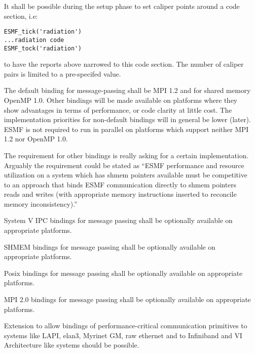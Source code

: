 
It shall be possible during the setup phase to set caliper points
around a code section, i.e:

\begin{verbatim}
ESMF_tick('radiation')
...radiation code
ESMF_tock('radiation')
\end{verbatim}

to have the reports above narrowed to this code section. The number of
caliper pairs is limited to a pre-specifed value.



The default binding for message-passing shall be MPI 1.2 and for
shared memory OpenMP 1.0. Other bindings will be made available on
platforms where they show advantages in terms of performance, or code
clarity at little cost. The implementation priorities for non-default
bindings will in general be lower (later). ESMF is not required to run
in parallel on platforms which support neither MPI 1.2 nor OpenMP 1.0.

The requirement for other bindings is really asking for a certain
implementation. Arguably the requirement could be stated as ``ESMF
performance and resource utilization on a system which has shmem
pointers available must be competitive to an approach that binds ESMF
communication directly to shmem pointers reads and writes (with
appropriate memory instructions inserted to reconcile memory
inconsistency).''


System V IPC bindings for message passing shall be optionally
available on appropriate platforms.


SHMEM bindings for message passing shall be optionally
available on appropriate platforms.


Posix bindings for message passing shall be optionally
available on appropriate platforms.


MPI 2.0 bindings for message passing shall be optionally
available on appropriate platforms.


Extension to allow bindings of performance-critical communication
primitives to systems like LAPI, elan3, Myrinet GM, raw ethernet and
to Infiniband and VI Architecture like systems should be possible.

